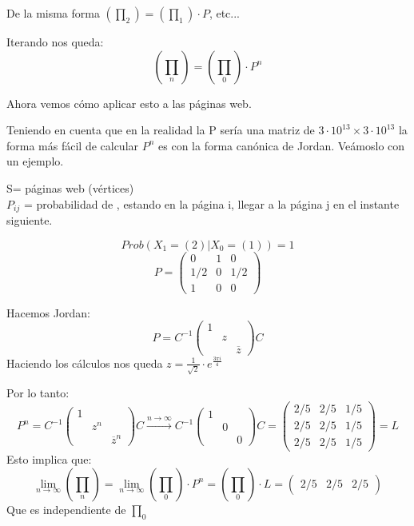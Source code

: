 De la misma forma $(\prod_2) = (\prod_1) \cdot P$, etc...

Iterando nos queda:
$$\left(\prod_n\right) = \left(\prod_0\right) \cdot P^n$$

Ahora vemos cómo aplicar esto a las páginas web.


Teniendo en cuenta que en la realidad la P sería una matriz de $3\cdot 10^{13} \times 3\cdot 10^{13}$ la forma más fácil de calcular $P^n$ es con la forma canónica de Jordan. Veámoslo con un ejemplo.
\begin{example}[1]{}



	\begin{center}
	\centering
\end{center}


	S= páginas web (vértices)\\
	$P_{ij}$ = probabilidad de , estando en la página i, llegar a la página j en el instante siguiente.

	$$Prob(X_1 = (2)| X_0 = (1)) = 1$$
	$$P =\left(\begin{matrix}
	0 & 1 & 0\\
	1/2 & 0 & 1/2\\
	1 & 0 & 0
	\end{matrix}\right)$$

	Hacemos Jordan:
	$$P = C^{-1} \left(\begin{matrix}
	1&&\\
	&z&\\
	&&\overline{z}
	\end{matrix}\right) C$$
	Haciendo los cálculos nos queda $z = \frac{1}{\sqrt{2}}\cdot e^{\frac{3\pi i}{4}}$

	Por lo tanto:
	$$P^n =  C^{-1} \left(\begin{matrix}
	1&&\\
	&z^n&\\
	&&\overline{z}^n
	\end{matrix}\right) C \stackrel{n\rightarrow \infty}{\rightarrow}  C^{-1} \left(\begin{matrix}
	1&&\\
	&0&\\
	&&0
	\end{matrix}\right) C = \left(\begin{matrix}
	2/5&2/5&1/5\\
	2/5&2/5&1/5\\
	2/5&2/5&1/5
	\end{matrix}\right) = L$$
	Esto implica que:
	$$\lim_{n\rightarrow\infty}(\prod_n) = \lim_{n\rightarrow\infty}(\prod_0)\cdot P^n = (\prod_0)\cdot L =( \begin{matrix}
	2/5&2/5&2/5
	\end{matrix})$$
	Que es independiente de $\prod_0$
\end{example}

